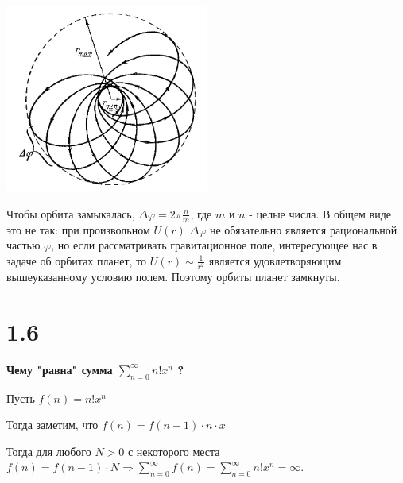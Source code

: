 \documentclass[a4paper,14pt]{article}
\begin{document}
\begin{center}
        \includegraphics[width=0.5\textwidth]{1.jpg}
\end{center}
Чтобы орбита замыкалась, $\Delta \varphi = 2\pi \frac{n}{m}$, где $m$ и $n$ - целые числа. В общем виде это не так: при произвольном $U(r)$ $\Delta \varphi$ не обязательно является рациональной частью $\varphi$, но если рассматривать гравитационное поле, интересующее нас в задаче об орбитах планет, то $U(r) \sim \frac{1}{r^2}$ является удовлетворяющим вышеуказанному условию полем. Поэтому орбиты планет замкнуты.

\section*{1.6}
\begin{center}
	\LARGE{\textbf{Чему "равна" сумма $\sum\limits_{n = 0}^{\infty}  n! x^n$ ?}}\\
\end{center}

Пусть $f(n) = n! x^n$

Тогда заметим, что $f(n) = f(n-1) \cdot n \cdot x$

Тогда для любого $N > 0$ с некоторого места $f(n) = f(n-1) \cdot N \Rightarrow \sum\limits_{n = 0}^{\infty} f(n) = \sum\limits_{n = 0}^{\infty}  n! x^n = \infty.$ 
\end{document}
